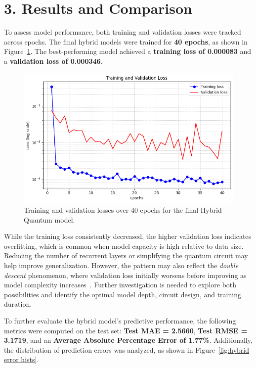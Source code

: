 \documentclass[10pt]{article}
\begin{document}
\section*{3. Results and Comparison}

To assess model performance, both training and validation losses were tracked across epochs. The final hybrid models were trained for \textbf{40 epochs}, as shown in Figure~\ref{fig:hybrid loss-curves}. The best-performing model achieved a \textbf{training loss of 0.000083} and a \textbf{validation loss of 0.000346}.


\begin{figure}[H]
    \centering
    \includegraphics[trim=0cm 0cm 0cm 0.75cm,clip,width=0.6\linewidth]{images/training and validation loss GRU quantum layers.png}
    \caption{Training and validation losses over 40 epochs for the final Hybrid Quantum model.}
    \label{fig:hybrid loss-curves}
\end{figure}

While the training loss consistently decreased, the higher validation loss indicates overfitting, which is common when model capacity is high relative to data size. Reducing the number of recurrent layers or simplifying the quantum circuit may help improve generalization. However, the pattern may also reflect the \textit{double descent} phenomenon, where validation loss initially worsens before improving as model complexity increases~\cite{belkin2019reconciling}. Further investigation is needed to explore both possibilities and identify the optimal model depth, circuit design, and training duration.

To further evaluate the hybrid model's predictive performance, the following metrics were computed on the test set: \textbf{Test MAE = 2.5660}, \textbf{Test RMSE = 3.1719}, and an \textbf{Average Absolute Percentage Error of 1.77\%}. Additionally, the distribution of prediction errors was analyzed, as shown in Figure~\ref{fig:hybrid error hists}.
\end{document}
